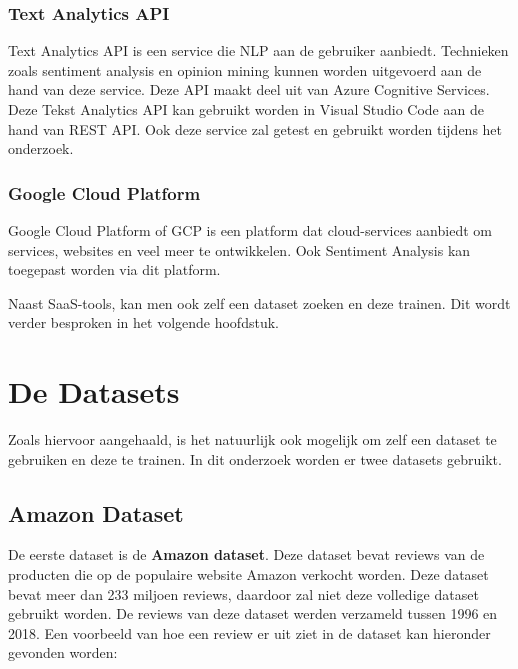 \subsubsection{Text Analytics API}
\label{textanalytics}

Text Analytics API is een service die NLP aan de gebruiker aanbiedt. Technieken zoals sentiment analysis en opinion mining kunnen worden uitgevoerd aan de hand van deze service. Deze API maakt deel uit van Azure Cognitive Services. \autocite{Microsoft2020} Deze Tekst Analytics API kan gebruikt worden in Visual Studio Code aan de hand van REST API. Ook deze service zal getest en gebruikt worden tijdens het onderzoek.

\subsubsection{Google Cloud Platform}
\label{googlecloudplatform}
Google Cloud Platform of GCP is een platform dat cloud-services aanbiedt om services, websites en veel meer te ontwikkelen. Ook Sentiment Analysis kan toegepast worden via dit platform. \autocite{axxius2021}



Naast SaaS-tools, kan men ook zelf een dataset zoeken en deze trainen. Dit wordt verder besproken in het volgende hoofdstuk.

\section{De Datasets}
\label{datasets} 

Zoals hiervoor aangehaald, is het natuurlijk ook mogelijk om zelf een dataset te gebruiken en deze te trainen. In dit onderzoek worden er twee datasets gebruikt.

\subsection{Amazon Dataset}
\label{amazon}

De eerste dataset is de \textbf{Amazon dataset}. Deze dataset bevat reviews van de producten die op de populaire website Amazon verkocht worden. Deze dataset bevat meer dan 233 miljoen reviews, daardoor zal niet deze volledige dataset gebruikt worden. De reviews van deze dataset werden verzameld tussen 1996 en 2018. \autocite{Ni2019} Een voorbeeld van hoe een review er uit ziet in de dataset kan hieronder gevonden worden: 
  
